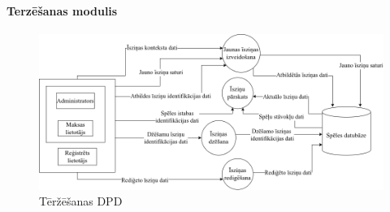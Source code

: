 \paragraph{Terzēšanas modulis}

\begin{figure}[htbp]
	\centering
	\includegraphics[width=\linewidth]{./src/img/TerzēšanasModulis.png}
	\caption{Tēržēšanas DPD}
	\label{fig:dpd-2-chat}
\end{figure}





